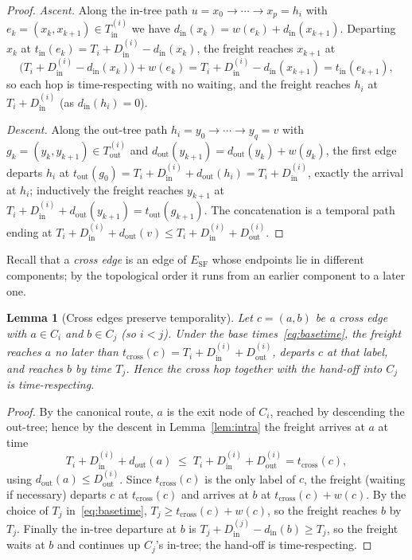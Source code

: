 \documentclass[11pt]{article}
\newtheorem{lemma}{Lemma}
\theoremstyle{definition}
\theoremstyle{remark}
\newcommand{\ESF}{E_{\mathrm{SF}}}
\newcommand{\Tin}{T^{(i)}_{\mathrm{in}}}
\newcommand{\Tout}{T^{(i)}_{\mathrm{out}}}
\newcommand{\din}{d_{\mathrm{in}}}
\newcommand{\dout}{d_{\mathrm{out}}}
\newcommand{\Din}{D^{(i)}_{\mathrm{in}}}
\newcommand{\Dout}{D^{(i)}_{\mathrm{out}}}
\begin{document}
\begin{proof}
\emph{Ascent.} Along the in-tree path $u=x_0\to\cdots\to x_p=h_i$ with $e_k=(x_k,x_{k+1})\in\Tin$ we
have $\din(x_k)=w(e_k)+\din(x_{k+1})$. Departing $x_k$ at $t_{\mathrm{in}}(e_k)=T_i+\Din-\din(x_k)$, the
freight reaches $x_{k+1}$ at
\[
  \big(T_i+\Din-\din(x_k)\big)+w(e_k)=T_i+\Din-\din(x_{k+1})=t_{\mathrm{in}}(e_{k+1}),
\]
so each hop is time-respecting with no waiting, and the freight reaches $h_i$ at $T_i+\Din$ (as
$\din(h_i)=0$).

\emph{Descent.} Along the out-tree path $h_i=y_0\to\cdots\to y_q=v$ with $g_k=(y_k,y_{k+1})\in\Tout$
and $\dout(y_{k+1})=\dout(y_k)+w(g_k)$, the first edge departs $h_i$ at
$t_{\mathrm{out}}(g_0)=T_i+\Din+\dout(h_i)=T_i+\Din$, exactly the arrival at $h_i$; inductively the
freight reaches $y_{k+1}$ at $T_i+\Din+\dout(y_{k+1})=t_{\mathrm{out}}(g_{k+1})$. The concatenation is
a temporal path ending at $T_i+\Din+\dout(v)\le T_i+\Din+\Dout$.
\end{proof}

Recall that a \emph{cross edge} is an edge of $\ESF$ whose endpoints lie in different components; by
the topological order it runs from an earlier component to a later one.

\begin{lemma}[Cross edges preserve temporality]\label{lem:cross}
Let $c=(a,b)$ be a cross edge with $a\in C_i$ and $b\in C_j$ (so $i<j$). Under the base
times~\eqref{eq:basetime}, the freight reaches $a$ no later than $t_{\mathrm{cross}}(c)=T_i+\Din+\Dout$,
departs $c$ at that label, and reaches $b$ by time $T_j$. Hence the cross hop together with the
hand-off into $C_j$ is time-respecting.
\end{lemma}

\begin{proof}
By the canonical route, $a$ is the exit node of $C_i$, reached by descending the out-tree; hence by
the descent in Lemma~\ref{lem:intra} the freight arrives at $a$ at time
\[
  T_i+\Din+\dout(a)\;\le\;T_i+\Din+\Dout=t_{\mathrm{cross}}(c),
\]
using $\dout(a)\le\Dout$. Since $t_{\mathrm{cross}}(c)$ is the only label of $c$, the freight (waiting
if necessary) departs $c$ at $t_{\mathrm{cross}}(c)$ and arrives at $b$ at $t_{\mathrm{cross}}(c)+w(c)$.
By the choice of $T_j$ in~\eqref{eq:basetime}, $T_j\ge t_{\mathrm{cross}}(c)+w(c)$, so the freight
reaches $b$ by $T_j$. Finally the in-tree departure at $b$ is $T_j+D^{(j)}_{\mathrm{in}}-\din(b)\ge T_j$,
so the freight waits at $b$ and continues up $C_j$'s in-tree; the hand-off is time-respecting.
\end{proof}
\end{document}

